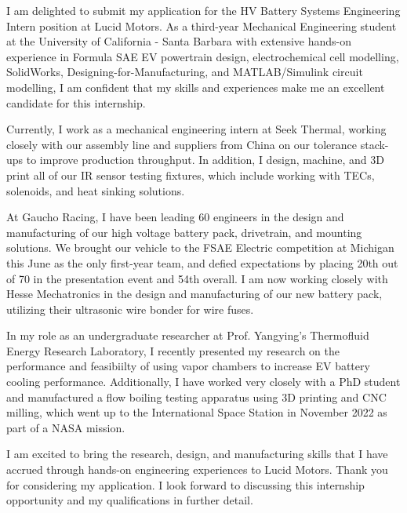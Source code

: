 \documentclass[11pt, letterpaper]{awesome-cv} %
\begin{document}
\makecvheader %

\makelettertitle %


\begin{cvletter}


I am delighted to submit my application for the HV Battery Systems Engineering Intern position at Lucid Motors. As a third-year Mechanical Engineering student at the University of California - Santa Barbara with extensive hands-on experience in Formula SAE EV powertrain design, electrochemical cell modelling, SolidWorks, Designing-for-Manufacturing, and MATLAB/Simulink circuit modelling, I am confident that my skills and experiences make me an excellent candidate for this internship.

Currently, I work as a mechanical engineering intern at Seek Thermal, working closely with our assembly line and suppliers from China on our tolerance stack-ups to improve production throughput. In addition, I design, machine, and 3D print all of our IR sensor testing fixtures, which include working with TECs, solenoids, and heat sinking solutions.

At Gaucho Racing, I have been leading 60 engineers in the design and manufacturing of our high voltage battery pack, drivetrain, and mounting solutions. We brought our vehicle to the FSAE Electric competition at Michigan this June as the only first-year team, and defied expectations by placing 20th out of 70 in the presentation event and 54th overall. I am now working closely with Hesse Mechatronics in the design and manufacturing of our new battery pack, utilizing their ultrasonic wire bonder for wire fuses. 

In my role as an undergraduate researcher at Prof. Yangying's Thermofluid Energy Research Laboratory, I recently presented my research on the performance and feasibiilty of using vapor chambers to increase EV battery cooling performance. Additionally, I have worked very closely with a PhD student and manufactured a flow boiling testing apparatus using 3D printing and CNC milling, which went up to the International Space Station in November 2022 as part of a NASA mission. 

I am excited to bring the research, design, and manufacturing skills that I have accrued through hands-on engineering experiences to Lucid Motors. Thank you for considering my application. I look forward to discussing this internship opportunity and my qualifications in further detail.


\end{cvletter}


\makeletterclosing %
\end{document}
